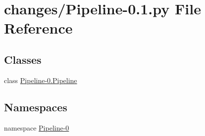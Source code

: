 \hypertarget{changes_2_pipeline-0_81_8py}{\section{changes/\-Pipeline-\/0.1.py \-File \-Reference}
\label{changes_2_pipeline-0_81_8py}
}
\subsection*{\-Classes}
\begin{DoxyCompactItemize}
\item 
class \hyperlink{class_pipeline-0_1_1_pipeline}{\-Pipeline-\/0.\-Pipeline}
\end{DoxyCompactItemize}
\subsection*{\-Namespaces}
\begin{DoxyCompactItemize}
\item 
namespace \hyperlink{namespace_pipeline-0}{\-Pipeline-\/0}
\end{DoxyCompactItemize}
